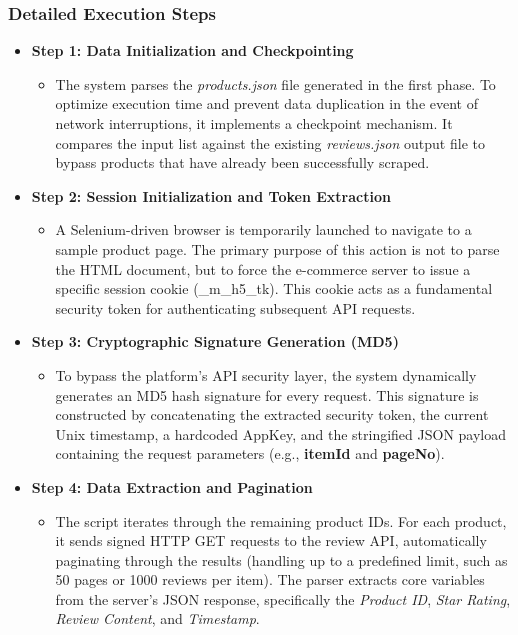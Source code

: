         \subsubsection{Detailed Execution Steps}
        \begin{itemize}
            \item \textbf{Step 1: Data Initialization and Checkpointing}
            \begin{itemize}
                \item The system parses the \textit{products.json} file generated in the first phase. To optimize execution time and prevent data duplication in the event of network interruptions, it implements a checkpoint mechanism. It compares the input list against the existing \textit{reviews.json} output file to bypass products that have already been successfully scraped.
            \end{itemize}

            \item \textbf{Step 2: Session Initialization and Token Extraction}
            \begin{itemize}
                \item A Selenium-driven browser is temporarily launched to navigate to a sample product page. The primary purpose of this action is not to parse the HTML document, but to force the e-commerce server to issue a specific session cookie (\_m\_h5\_tk). This cookie acts as a fundamental security token for authenticating subsequent API requests.
            \end{itemize}

            \item \textbf{Step 3: Cryptographic Signature Generation (MD5)}
            \begin{itemize}
                \item To bypass the platform's API security layer, the system dynamically generates an MD5 hash signature for every request. This signature is constructed by concatenating the extracted security token, the current Unix timestamp, a hardcoded AppKey, and the stringified JSON payload containing the request parameters (e.g., \textbf{itemId} and \textbf{pageNo}).
            \end{itemize}

            \item \textbf{Step 4: Data Extraction and Pagination}
            \begin{itemize}
                \item The script iterates through the remaining product IDs. For each product, it sends signed HTTP GET requests to the review API, automatically paginating through the results (handling up to a predefined limit, such as 50 pages or 1000 reviews per item). The parser extracts core variables from the server's JSON response, specifically the \textit{Product ID}, \textit{Star Rating}, \textit{Review Content}, and \textit{Timestamp}.
            \end{itemize}


\end{itemize}
